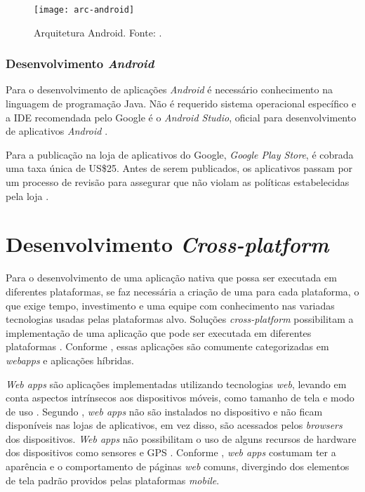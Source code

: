 \begin{figure}[h]
  \centering
    \texttt{[image: arc-android]}
    \caption[Arquitetura Android]{ Arquitetura Android. Fonte: \cite{android_android_2016}.}
	\label{fig:arc-android}
\end{figure}

\subsubsection{Desenvolvimento \textit{Android}} \label{subsection:dev-android}

Para o desenvolvimento de aplicações \textit{Android} é necessário conhecimento na linguagem de programação Java.
Não é requerido sistema operacional específico e a IDE recomendada pelo Google é o \textit{Android Studio}, oficial para desenvolvimento de aplicativos \textit{Android} \cite{android_meet_2016}.

Para a publicação na loja de aplicativos do Google, \textit{Google Play Store}, é cobrada uma taxa única de US\$25. 
Antes de serem publicados, os aplicativos passam por um processo de revisão para assegurar que não violam as políticas estabelecidas pela loja \cite{meier_creating_2015}.  

\section{Desenvolvimento \textit{Cross-platform}} \label{section:desenvolvimentomulti}

Para o desenvolvimento de uma aplicação nativa que possa ser executada em diferentes plataformas, se faz necessária a criação de uma para cada plataforma, o que exige tempo, investimento e uma equipe com conhecimento nas variadas tecnologias usadas pelas plataformas alvo.
Soluções \textit{cross-platform} possibilitam a implementação de uma aplicação que pode ser executada em diferentes plataformas \cite{kassas_taxonomy_2015}. Conforme , essas aplicações são comumente categorizadas em \textit{webapps} e aplicações híbridas.

\textit{Web apps} são aplicações implementadas utilizando tecnologias \textit{web}, levando em conta aspectos intrínsecos aos dispositivos móveis, como tamanho de tela e modo de uso \cite{heitkotter_evaluating_2013}. Segundo , \textit{web apps} não são instalados no dispositivo e não ficam disponíveis nas lojas de aplicativos, em vez disso, são acessados pelos \textit{browsers} dos dispositivos. \textit{Web apps} não possibilitam o uso de alguns recursos de hardware dos dispositivos como sensores e GPS \cite{heitkotter_evaluating_2013}. Conforme , \textit{web apps} costumam ter a aparência e o comportamento de páginas \textit{web} comuns, divergindo dos elementos de tela padrão providos pelas plataformas \textit{mobile}.

